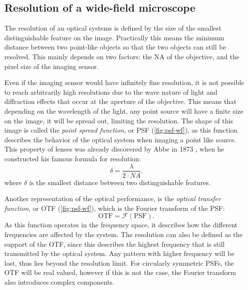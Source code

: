   \subsection{Resolution of a wide-field microscope}
    \label{sec:resolution}
    The resolution of an optical systems is defined by the size of the smallest distinguishable feature on the image. Practically this means the minimum distance between two point-like objects so that the two objects can still be resolved. This mainly depends on two factors: the NA of the objective, and the pixel size of the imaging sensor.

    Even if the imaging sensor would have infinitely fine resolution, it is not possible to reach arbitrarily high resolutions due to the wave nature of light and diffraction effects that occur at the aperture of the objective. This means that depending on the wavelength of the light, any point source will have a finite size on the image, it will be spread out, limiting the resolution. The shape of this image is called the \textit{point spread function}, or PSF (\autoref{fig:psf-wf}), as this function describes the behavior of the optical system when imaging a point like source. This property of lenses was already discovered by Abbe in 1873 \cite{abbe_beitrage_1873}, when he constructed his famous formula for resolution:
    \begin{equation}
      \delta = \frac{\lambda}{2 \cdot NA}.
      \label{eq:abbe}
    \end{equation}
    where $\delta$ is the smallest distance between two distinguishable features.

    Another representation of the optical performance, is the \textit{optical transfer function}, or OTF (\autoref{fig:psf-wf}), which is the Fourier transform of the PSF:
    \begin{equation}
      \text{OTF} = \mathcal{F}(\text{PSF}).
    \end{equation}
    As this function operates in the frequency space, it describes how the different frequencies are affected by the system. The resolution can also be defined as the support of the OTF, since this describes the highest frequency that is still transmitted by the optical system. Any pattern with higher frequency will be lost, thus lies beyond the resolution limit. For circularly symmetric PSFs, the OTF will be real valued, however if this is not the case, the Fourier transform also introduces complex components.

